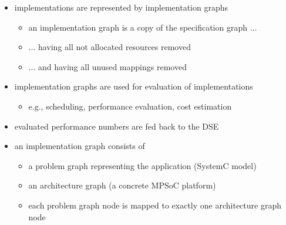 \begin{frame}[t]
\begin{itemize}
\item implementations are represented by implementation graphs
\begin{itemize}
\item an implementation graph is a copy of the specification graph ...
\item ... having all not allocated resources removed
\item ... and having all unused mappings removed
\end{itemize}
\item implementation graphs are used for evaluation of implementations
\begin{itemize}
\item e.g., scheduling, performance evaluation, cost estimation
\end{itemize}
\item evaluated performance numbers are fed back to the DSE
\end{itemize}
\end{frame}


\begin{frame}[t]
\begin{figure}
\vspace{-5mm}
\centering
\resizebox{0.5\columnwidth}{!}{}
\end{figure}
\begin{itemize}
\item an implementation graph consists of 
\begin{itemize}
\item a problem graph representing the application (SystemC model)
\item an architecture graph (a concrete MPSoC platform)
\item each problem graph node is mapped to exactly one architecture graph node
\end{itemize}
\end{itemize}
\end{frame}


